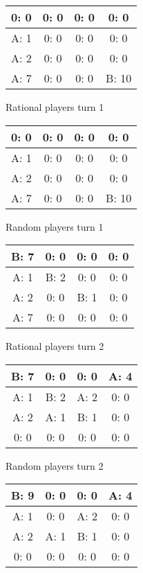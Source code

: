 \documentclass[12pt]{article}
\begin{document}
\begin{center}
\begin{tabular}{|c|c|c|c|}
\hline
0: 0  & 0: 0  & 0: 0  & 0: 0  \\ \hline
A: 1  & 0: 0  & 0: 0  & 0: 0  \\ \hline
A: 2  & 0: 0  & 0: 0  & 0: 0  \\ \hline
A: 7  & 0: 0  & 0: 0  & B: 10  \\ \hline
\end{tabular}
\end{center}

Rational players turn 1
\begin{center}
\begin{tabular}{|c|c|c|c|}
\hline
0: 0  & 0: 0  & 0: 0  & 0: 0  \\ \hline
A: 1  & 0: 0  & 0: 0  & 0: 0  \\ \hline
A: 2  & 0: 0  & 0: 0  & 0: 0  \\ \hline
A: 7  & 0: 0  & 0: 0  & B: 10  \\ \hline
\end{tabular}
\end{center}
Random players turn 1
\begin{center}
\begin{tabular}{|c|c|c|c|}
\hline
B: 7  & 0: 0  & 0: 0  & 0: 0  \\ \hline
A: 1  & B: 2  & 0: 0  & 0: 0  \\ \hline
A: 2  & 0: 0  & B: 1  & 0: 0  \\ \hline
A: 7  & 0: 0  & 0: 0  & 0: 0  \\ \hline
\end{tabular}
\end{center}

Rational players turn 2
\begin{center}
\begin{tabular}{|c|c|c|c|}
\hline
B: 7  & 0: 0  & 0: 0  & A: 4  \\ \hline
A: 1  & B: 2  & A: 2  & 0: 0  \\ \hline
A: 2  & A: 1  & B: 1  & 0: 0  \\ \hline
0: 0  & 0: 0  & 0: 0  & 0: 0  \\ \hline
\end{tabular}
\end{center}
Random players turn 2
\begin{center}
\begin{tabular}{|c|c|c|c|}
\hline
B: 9  & 0: 0  & 0: 0  & A: 4  \\ \hline
A: 1  & 0: 0  & A: 2  & 0: 0  \\ \hline
A: 2  & A: 1  & B: 1  & 0: 0  \\ \hline
0: 0  & 0: 0  & 0: 0  & 0: 0  \\ \hline
\end{tabular}
\end{center}
\end{document}
